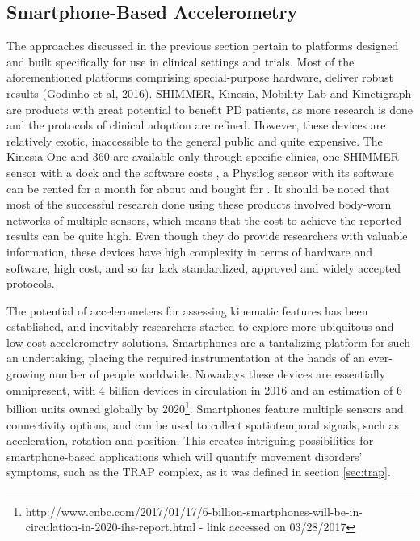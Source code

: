 
\subsection{Smartphone-Based Accelerometry}
\label{subsec:smartphones}
The approaches discussed in the previous section pertain to platforms designed and built specifically for use in clinical settings and trials. Most of the aforementioned platforms comprising special-purpose hardware, deliver robust results (Godinho et al, 2016). \gls{SHIMMER}, Kinesia, Mobility Lab and Kinetigraph are products with great potential to benefit \gls{PD} patients, as more research is done and the protocols of clinical adoption are refined. However, these devices are relatively exotic, inaccessible to the general public and quite expensive. The Kinesia One and 360 are available only through specific clinics, one \gls{SHIMMER} sensor with a dock and the software costs , a Physilog sensor with its software can be rented for a month for about  and bought for . It should be noted that most of the successful research done using these products involved body-worn networks of multiple sensors, which means that the cost to achieve the reported results can be quite high. Even though they do provide researchers with valuable information, these devices have high complexity in terms of hardware and software, high cost, and so far lack standardized, approved and widely accepted protocols.

The potential of accelerometers for assessing kinematic features has been established, and inevitably researchers started to explore more ubiquitous and low-cost accelerometry solutions. Smartphones are a tantalizing platform for such an undertaking, placing the required instrumentation at the hands of an ever-growing number of people worldwide. Nowadays these devices are essentially omnipresent, with \textcolor{BurntOrange}{4 billion devices in circulation} in 2016 and an estimation of \textcolor{BurntOrange}{6 billion units owned globally by 2020}\footnote{http://www.cnbc.com/2017/01/17/6-billion-smartphones-will-be-in-circulation-in-2020-ihs-report.html - link accessed on 03/28/2017}. Smartphones feature multiple sensors and connectivity options, and can be used to collect spatiotemporal signals, such as acceleration, rotation and position. This creates intriguing possibilities for smartphone-based applications which will quantify movement disorders' symptoms, such as the \gls{TRAP} complex, as it was defined in section \ref{sec:trap}.

